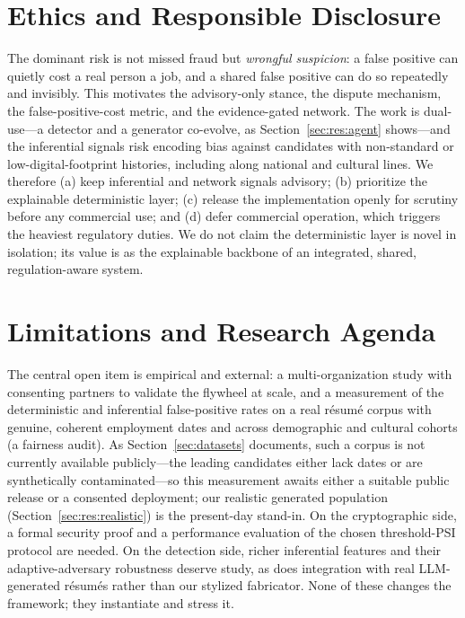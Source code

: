 \documentclass[11pt]{article}
\begin{document}
\section{Ethics and Responsible Disclosure}\label{sec:ethics}
The dominant risk is not missed fraud but \emph{wrongful suspicion}: a false
positive can quietly cost a real person a job, and a shared false positive can do
so repeatedly and invisibly. This motivates the advisory-only stance, the dispute
mechanism, the false-positive-cost metric, and the evidence-gated network. The
work is dual-use---a detector and a generator co-evolve, as
Section~\ref{sec:res:agent} shows---and the inferential signals risk encoding bias
against candidates with non-standard or low-digital-footprint histories,
including along national and cultural lines. We therefore (a) keep inferential and
network signals advisory; (b) prioritize the explainable deterministic layer; (c)
release the implementation openly for scrutiny before any commercial use; and (d)
defer commercial operation, which triggers the heaviest regulatory duties. We do
not claim the deterministic layer is novel in isolation; its value is as the
explainable backbone of an integrated, shared, regulation-aware system.

\section{Limitations and Research Agenda}\label{sec:agenda}
The central open item is empirical and external: a multi-organization study with
consenting partners to validate the flywheel at scale, and a measurement of the
deterministic and inferential false-positive rates on a real r\'esum\'e corpus
with genuine, coherent employment dates and across demographic and cultural
cohorts (a fairness audit). As Section~\ref{sec:datasets} documents, such a corpus
is not currently available publicly---the leading candidates either lack dates or
are synthetically contaminated---so this measurement awaits either a suitable
public release or a consented deployment; our realistic generated population
(Section~\ref{sec:res:realistic}) is the present-day stand-in. On
the cryptographic side, a formal security proof and a performance evaluation of
the chosen threshold-PSI protocol are needed. On the detection side, richer
inferential features and their adaptive-adversary robustness deserve study, as
does integration with real LLM-generated r\'esum\'es rather than our stylized
fabricator. None of these changes the framework; they instantiate and stress it.
\end{document}
